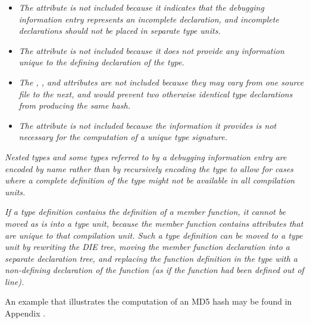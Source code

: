 \begin{itemize}
\item \textit{The  attribute is not included because it
indicates that the debugging information entry represents an
incomplete declaration, and incomplete declarations should
not be placed in 
separate type units.}

\item \textit{The  attribute is not included because
it does not provide any information unique to the defining
declaration of the type.}

\item \textit{The , 
, and
 attributes are not included because they
may vary from one source file to the next, and would prevent
two otherwise identical type declarations from producing the
same hash.}

\item \textit{The  attribute is not included 
because the information it provides is not necessary for the 
computation of a unique type signature.}

\end{itemize}

\textit{Nested types and some types referred to by a debugging 
information entry are encoded by name rather than by recursively 
encoding the type to allow for cases where a complete definition 
of the type might not be available in all compilation units.}

\textit{If a type definition contains the definition of a member function, 
it cannot be moved as is into a type unit, because the member function 
contains attributes that are unique to that compilation unit. 
Such a type definition can be moved to a type unit by rewriting the DIE tree, 
moving the member function declaration into a separate declaration tree, 
and replacing the function definition in the type with a non-defining 
declaration of the function (as if the function had been defined out of 
line).}

An example that illustrates the computation of an MD5 hash may be found in 
Appendix .

